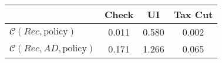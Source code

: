 \begin{tabular}{@{}lccc@{}}
\toprule
                          & Check      & UI    & Tax Cut    \\  \midrule
$\mathcal{C}(Rec,\text{policy})$ & 0.011  & 0.580  & 0.002     \\
$\mathcal{C}(Rec, AD,\text{policy})$ & 0.171  & 1.266  & 0.065     \\
\end{tabular}
